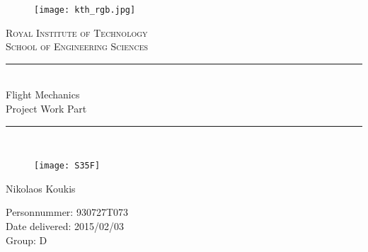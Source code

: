 \newcommand{\horrule}[1]{\rule{\linewidth}{#1}} %

\begin{titlepage}

\begin{center}
\begin{figure}[htpb]
    \begin{center}
        \texttt{[image: kth\_rgb.jpg]} %
    \end{center}
\end{figure}

\normalfont \normalsize 
\textsc{Royal Institute of Technology} \\  %
\textsc{School of Engineering Sciences} \\ [25pt] %
\horrule{0.5pt} \\[0.4cm] %
\huge Flight Mechanics \vspace{5mm}\\ Project Work Part \\ %
\horrule{2pt} \\[0.5cm] %
\vspace*{10mm}

\begin{figure}[H]
    \centering
    \texttt{[image: S35F]}
\end{figure}

\LARGE 
Nikolaos Koukis

\vfill
\normalsize \normalfont
Personnummer: 930727T073\\
Date delivered: 2015/02/03\\
Group: D
\end{center}
\end{titlepage}
